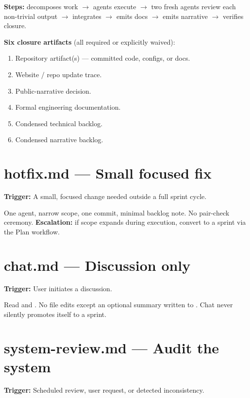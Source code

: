\documentclass[a4paper,11pt,openany]{report}
\begin{document}
\textbf{Steps:}  decomposes work $\to$ 
agents execute $\to$ two fresh  agents review each non-trivial
output $\to$  integrates $\to$  emits docs
$\to$  emits narrative $\to$ 
verifies closure.

\textbf{Six closure artifacts} (all required or explicitly waived):
\begin{enumerate}
  \item Repository artifact(s) --- committed code, configs, or docs.
  \item Website / repo update trace.
  \item Public-narrative decision.
  \item Formal engineering documentation.
  \item Condensed technical backlog.
  \item Condensed narrative backlog.
\end{enumerate}

\section{hotfix.md --- Small focused fix}

\textbf{Trigger:} A small, focused change needed outside a full sprint cycle.

One  agent, narrow scope, one commit, minimal backlog note.
No pair-check ceremony. \textbf{Escalation:} if scope expands during execution,
convert to a sprint via the Plan workflow.

\section{chat.md --- Discussion only}

\textbf{Trigger:} User initiates a discussion.

Read  and . No file edits except
an optional summary written to . Chat never silently
promotes itself to a sprint.

\section{system-review.md --- Audit the system}

\textbf{Trigger:} Scheduled review, user request, or detected inconsistency.
\end{document}
